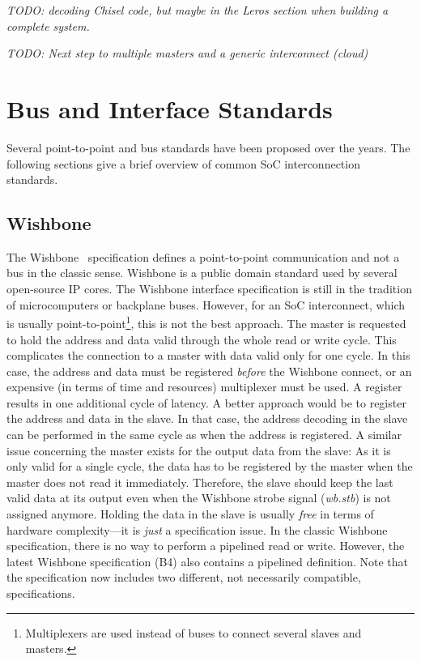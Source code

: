 \documentclass[%
    10pt,
    headinclude, footexclude,
    openright, %
    notitlepage,
    cleardoubleempty,
    headsepline,
    pointlessnumbers,
    bibtotoc, idxtotoc,
    ]{scrbook}
\newcommand{\todo}[1]{{\emph{TODO: #1}}}
\begin{document}


\todo{decoding Chisel code, but maybe in the Leros section when building a complete system.}

\todo{Next step to multiple masters and a generic interconnect (cloud)}

\section{Bus and Interface Standards}

Several point-to-point and bus standards have been proposed over the
years. The following sections give a brief overview of common
SoC interconnection standards.

\subsection{Wishbone}

The Wishbone~\cite{soc:wishbone} specification defines
a point-to-point communication and not a bus in the classic sense.
Wishbone is a public domain standard used by
several open-source IP cores. The Wishbone interface specification
is still in the tradition of microcomputers or backplane buses.
However, for an SoC interconnect, which is usually
point-to-point\footnote{Multiplexers are used instead of buses to
connect several slaves and masters.}, this is not the best approach.
The master is requested to hold the address and data valid through
the whole read or write cycle. This complicates the connection to a
master with data valid only for one cycle. In this case, the
address and data must be registered \emph{before} the Wishbone
connect, or an expensive (in terms of time and resources) multiplexer must be
used. A register results in one additional cycle of latency. A better
approach would be to register the address and data in the slave. In
that case, the address decoding in the slave can be performed in the
same cycle as when the address is registered. A similar issue concerning
the master exists for the output data from the slave: As
it is only valid for a single cycle, the data has to be registered by
the master when the master does not read it immediately. Therefore,
the slave should keep the last valid data at its output even when
the Wishbone strobe signal (\emph{wb.stb}) is not assigned anymore.
Holding the data in the slave is usually \emph{free} in terms of
hardware complexity---it is \emph{just} a specification issue. In
the classic Wishbone specification, there is no way to perform a pipelined read
or write. However, the latest Wishbone specification (B4) also contains
a pipelined definition. Note that the specification now includes two
different, not necessarily compatible, specifications.
\end{document}
